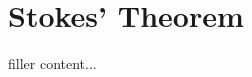 \documentclass[../../templates/section]{subfiles}
\begin{document}
\section{Stokes' Theorem}\label{sec:stokes-theorem}

filler content...
\end{document}
